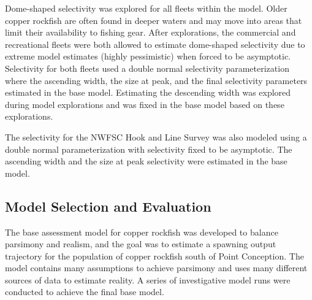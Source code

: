 \documentclass[11pt,
  english,
  a4paper,
]{article}
\begin{document}
\leavevmode\tagmcend\tagstructend\par


Dome-shaped selectivity was explored for all fleets within the model. Older copper rockfish are often found in deeper waters and may move into areas that limit their availability to fishing gear. After explorations, the commercial and recreational fleets were both allowed to estimate dome-shaped selectivity due to extreme model estimates (highly pessimistic) when forced to be asymptotic. Selectivity for both fleets used a double normal selectivity parameterization where the ascending width, the size at peak, and the final selectivity parameters estimated in the base model. Estimating the descending width was explored during model explorations and was fixed in the base model based on these explorations.

\leavevmode\tagmcend\tagstructend\par


The selectivity for the NWFSC Hook and Line Survey was also modeled using a double normal parameterization with selectivity fixed to be asymptotic. The ascending width and the size at peak selectivity were estimated in the base model.

\leavevmode\tagmcend\tagstructend\par


\hypertarget{model-selection-and-evaluation}{%
\subsection{Model Selection and Evaluation}\label{model-selection-and-evaluation}}

\leavevmode\tagmcend\tagstructend


The base assessment model for copper rockfish was developed to balance parsimony and realism, and the goal was to estimate a spawning output trajectory for the population of copper rockfish south of Point Conception. The model contains many assumptions to achieve parsimony and uses many different sources of data to estimate reality. A series of investigative model runs were conducted to achieve the final base model.

\leavevmode\tagmcend\tagstructend\par
\end{document}
